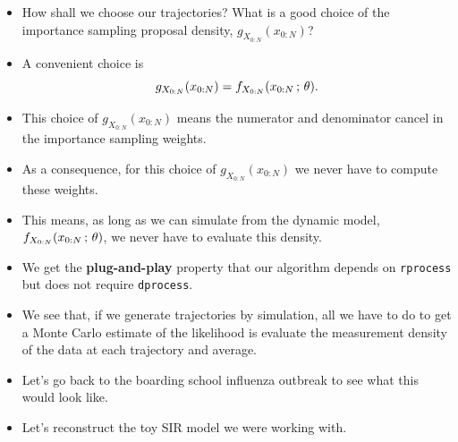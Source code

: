 \documentclass[]{article}
\begin{document}
\begin{itemize}
\item
  How shall we choose our trajectories? What is a good choice of the
  importance sampling proposal density, \(g_{X_{0:N}}(x_{0:N})\)?
\item
  A convenient choice is
  \[ g_{X_{0:N}}(x_{0:N}) = f_{X_{0:N}}(x_{0:N}\, ; \,\theta).\]
\item
  This choice of \(g_{X_{0:N}}(x_{0:N})\) means the numerator and
  denominator cancel in the importance sampling weights.
\item
  As a consequence, for this choice of \(g_{X_{0:N}}(x_{0:N})\) we never
  have to compute these weights.
\item
  This means, as long as we can simulate from the dynamic model,
  \(f_{X_{0:N}}(x_{0:N}\, ; \,\theta)\), we never have to evaluate this
  density.
\item
  We get the \textbf{plug-and-play} property that our algorithm depends
  on \texttt{rprocess} but does not require \texttt{dprocess}.
\item
  We see that, if we generate trajectories by simulation, all we have to
  do to get a Monte Carlo estimate of the likelihood is evaluate the
  measurement density of the data at each trajectory and average.
\item
  Let's go back to the boarding school influenza outbreak to see what
  this would look like.
\item
  Let's reconstruct the toy SIR model we were working with.
\end{itemize}
\end{document}

